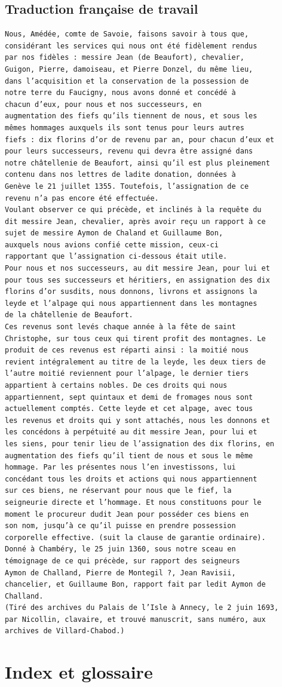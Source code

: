 \documentclass[a4paper,twoside,openany]{article}
\begin{document}
\subsection{Traduction française de travail}

\begin{Verbatim}
Nous, Amédée, comte de Savoie, faisons savoir à tous que,
considérant les services qui nous ont été fidèlement rendus
par nos fidèles : messire Jean (de Beaufort), chevalier,
Guigon, Pierre, damoiseau, et Pierre Donzel, du même lieu,
dans l’acquisition et la conservation de la possession de
notre terre du Faucigny, nous avons donné et concédé à
chacun d’eux, pour nous et nos successeurs, en
augmentation des fiefs qu’ils tiennent de nous, et sous les
mêmes hommages auxquels ils sont tenus pour leurs autres
fiefs : dix florins d’or de revenu par an, pour chacun d’eux et
pour leurs successeurs, revenu qui devra être assigné dans
notre châtellenie de Beaufort, ainsi qu’il est plus pleinement
contenu dans nos lettres de ladite donation, données à
Genève le 21 juillet 1355. Toutefois, l’assignation de ce
revenu n’a pas encore été effectuée.
Voulant observer ce qui précède, et inclinés à la requête du
dit messire Jean, chevalier, après avoir reçu un rapport à ce
sujet de messire Aymon de Chaland et Guillaume Bon,
auxquels nous avions confié cette mission, ceux-ci
rapportant que l’assignation ci-dessous était utile.
Pour nous et nos successeurs, au dit messire Jean, pour lui et
pour tous ses successeurs et héritiers, en assignation des dix
florins d’or susdits, nous donnons, livrons et assignons la
leyde et l’alpage qui nous appartiennent dans les montagnes
de la châtellenie de Beaufort.
Ces revenus sont levés chaque année à la fête de saint
Christophe, sur tous ceux qui tirent profit des montagnes. Le
produit de ces revenus est réparti ainsi : la moitié nous
revient intégralement au titre de la leyde, les deux tiers de
l’autre moitié reviennent pour l’alpage, le dernier tiers
appartient à certains nobles. De ces droits qui nous
appartiennent, sept quintaux et demi de fromages nous sont
actuellement comptés. Cette leyde et cet alpage, avec tous
les revenus et droits qui y sont attachés, nous les donnons et
les concédons à perpétuité au dit messire Jean, pour lui et
les siens, pour tenir lieu de l’assignation des dix florins, en
augmentation des fiefs qu’il tient de nous et sous le même
hommage. Par les présentes nous l’en investissons, lui
concédant tous les droits et actions qui nous appartiennent
sur ces biens, ne réservant pour nous que le fief, la
seigneurie directe et l’hommage. Et nous constituons pour le
moment le procureur dudit Jean pour posséder ces biens en
son nom, jusqu’à ce qu’il puisse en prendre possession
corporelle effective. (suit la clause de garantie ordinaire).
Donné à Chambéry, le 25 juin 1360, sous notre sceau en
témoignage de ce qui précède, sur rapport des seigneurs
Aymon de Challand, Pierre de Montegil ?, Jean Ravisii,
chancelier, et Guillaume Bon, rapport fait par ledit Aymon de
Challand.
(Tiré des archives du Palais de l’Isle à Annecy, le 2 juin 1693,
par Nicollin, clavaire, et trouvé manuscrit, sans numéro, aux
archives de Villard-Chabod.)
\end{Verbatim}

\section{Index et glossaire}

\printglossary[title=Glossaire]
\printindex[nom]
\printindex[lieu]
\printindex[notion]

\printbibliography
\end{document}
